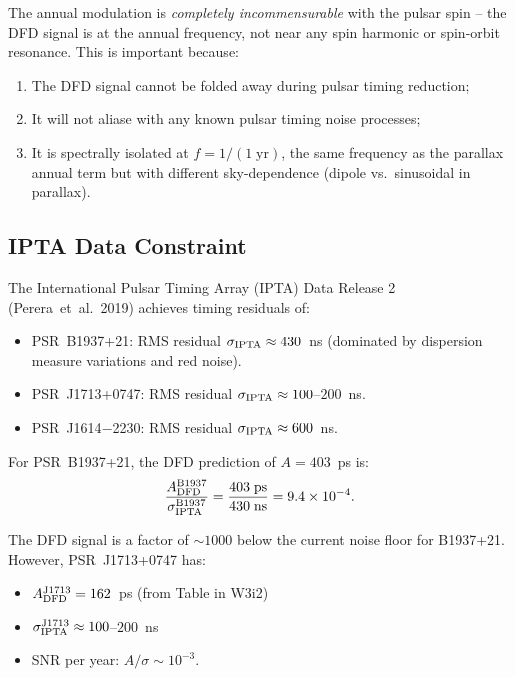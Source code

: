 \documentclass[aps,prd,twocolumn,superscriptaddress,nofootinbib]{revtex4-2}
\begin{document}
The annual modulation is \emph{completely incommensurable} with the pulsar
spin -- the DFD signal is at the annual frequency, not near any spin
harmonic or spin-orbit resonance. This is important because:
\begin{enumerate}
\item The DFD signal cannot be folded away during pulsar timing reduction;
\item It will not aliase with any known pulsar timing noise processes;
\item It is spectrally isolated at $f = 1/(1\;\text{yr})$, the same
      frequency as the parallax annual term but with different
      sky-dependence (dipole vs.\ sinusoidal in parallax).
\end{enumerate}

\subsection{IPTA Data Constraint}

The International Pulsar Timing Array (IPTA) Data Release 2 (Perera~et~al.\ 2019)
achieves timing residuals of:
\begin{itemize}
\item PSR~B1937+21: RMS residual $\sigma_{\rm IPTA} \approx 430$~ns
      (dominated by dispersion measure variations and red noise).
\item PSR~J1713+0747: RMS residual $\sigma_{\rm IPTA} \approx 100$--$200$~ns.
\item PSR~J1614$-$2230: RMS residual $\sigma_{\rm IPTA} \approx 600$~ns.
\end{itemize}

For PSR~B1937+21, the DFD prediction of $A = 403$~ps is:
\begin{equation}
\frac{A_{\rm DFD}^{\rm B1937}}{\sigma_{\rm IPTA}^{\rm B1937}}
= \frac{403\;\text{ps}}{430\;\text{ns}} = 9.4\times10^{-4}.
\label{eq:ipta_ratio}
\end{equation}

The DFD signal is a factor of $\sim 1000$ below the current noise floor
for B1937+21. However, PSR~J1713+0747 has:
\begin{itemize}
\item $A_{\rm DFD}^{\rm J1713} = 162$~ps (from Table in W3i2)
\item $\sigma_{\rm IPTA}^{\rm J1713} \approx 100$--$200$~ns
\item SNR per year: $A/\sigma \sim 10^{-3}$.
\end{itemize}
\end{document}
